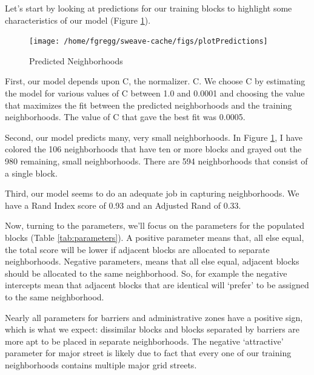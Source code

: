 \documentclass[12pt,letter]{article}\usepackage[]{graphicx}\usepackage[]{color}
\newenvironment{knitrout}{}{} %
\begin{document}
Let’s start by looking at predictions for our training blocks to
highlight some characteristics of our model (Figure
\ref{fig:predictTraining}).

\begin{figure}
\begin{knitrout}
\color{fgcolor}

{\centering \texttt{[image: /home/fgregg/sweave-cache/figs/plotPredictions]} 

}



\end{knitrout}

\caption{Predicted Neighborhoods}
\label{fig:predictTraining}
\end{figure}




First, our model depends upon C, the normalizer.  C. We choose C by
estimating the model for various values of C between 1.0 and 0.0001
and choosing the value that maximizes the fit between the predicted
neighborhoods and the training neighborhoods. The value of C that gave
the best fit was 0.0005.

Second, our model predicts many, very small neighborhoods. In Figure
\ref{fig:predictTraining}, I have colored the
106 neighborhoods that have ten or more
blocks and grayed out the 980 remaining,
small neighborhoods. There are 594
neighborhoods that consist of a single block.

Third, our model seems to do an adequate job in capturing
neighborhoods. We have a Rand Index score of 0.93 and an
Adjusted Rand of 0.33.

Now, turning to the parameters, we'll focus on the parameters for the
populated blocks (Table \ref{tab:parameters}). A positive parameter
means that, all else equal, the total score will be lower if adjacent
blocks are allocated to separate neighborhoods. Negative parameters,
means that all else equal, adjacent blocks should be allocated to the
same neighborhood. So, for example the negative intercepts mean that
adjacent blocks that are identical will ‘prefer’ to be assigned to the
same neighborhood.

Nearly all parameters for barriers and administrative zones have a
positive sign, which is what we expect: dissimilar blocks and blocks
separated by barriers are more apt to be placed in separate
neighborhoods. The negative `attractive' parameter for major street is
likely due to fact that every one of our training neighborhoods
contains multiple major grid streets.
\end{document}
